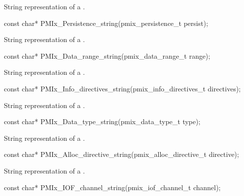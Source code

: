 \summary
{}

String representation of a .

\cspecificstart
\begin{codepar}
const char*
PMIx_Persistence_string(pmix_persistence_t persist);
\end{codepar}
\cspecificend

\summary
{}

String representation of a .

\cspecificstart
\begin{codepar}
const char*
PMIx_Data_range_string(pmix_data_range_t range);
\end{codepar}
\cspecificend

\summary
{}

String representation of a .

\cspecificstart
\begin{codepar}
const char*
PMIx_Info_directives_string(pmix_info_directives_t directives);
\end{codepar}
\cspecificend

\summary
{}

String representation of a .

\cspecificstart
\begin{codepar}
const char*
PMIx_Data_type_string(pmix_data_type_t type);
\end{codepar}
\cspecificend

\summary
{}

String representation of a .

\cspecificstart
\begin{codepar}
const char*
PMIx_Alloc_directive_string(pmix_alloc_directive_t directive);
\end{codepar}
\cspecificend

\summary
{}

String representation of a .

\cspecificstart
\begin{codepar}
const char*
PMIx_IOF_channel_string(pmix_iof_channel_t channel);
\end{codepar}
\cspecificend


